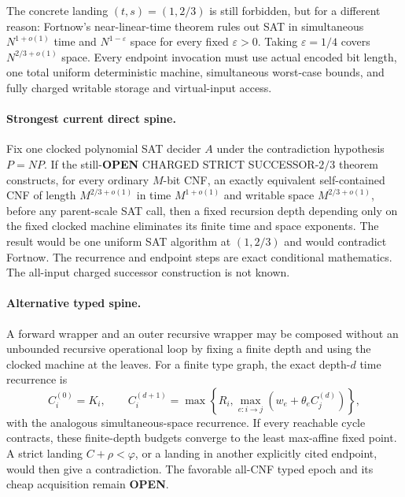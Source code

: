 \documentclass[11pt]{article}
\begin{document}
The concrete landing $(t,s)=(1,2/3)$ is still forbidden, but for a different
reason: Fortnow's near-linear-time theorem rules out SAT in simultaneous
$N^{1+o(1)}$ time and $N^{1-\varepsilon}$ space for every fixed
$\varepsilon>0$.  Taking $\varepsilon=1/4$ covers
$N^{2/3+o(1)}$ space.  Every endpoint invocation must use actual encoded bit
length, one total uniform deterministic machine, simultaneous worst-case
bounds, and fully charged writable storage and virtual-input access.

\paragraph{Strongest current direct spine.}
Fix one clocked polynomial SAT decider $A$ under the contradiction hypothesis
$P=NP$.  If the still-\textbf{OPEN} CHARGED STRICT SUCCESSOR-$2/3$ theorem
constructs, for every ordinary $M$-bit CNF, an exactly equivalent
self-contained CNF of length $M^{2/3+o(1)}$ in time $M^{1+o(1)}$ and writable
space $M^{2/3+o(1)}$, before any parent-scale SAT call, then a fixed recursion
depth depending only on the fixed clocked machine eliminates its finite time
and space exponents.  The result would be one uniform SAT algorithm at
$(1,2/3)$ and would contradict Fortnow.  The recurrence and endpoint steps are
exact conditional mathematics.  The all-input charged successor construction
is not known.

\paragraph{Alternative typed spine.}
A forward wrapper and an outer recursive wrapper may be composed without an
unbounded recursive operational loop by fixing a finite depth and using the
clocked machine at the leaves.  For a finite type graph, the exact depth-$d$
time recurrence is
\[
 C_i^{(0)}=K_i,
 \qquad
 C_i^{(d+1)}=
 \max\!\left\{R_i,\max_{e:i\to j}
       (w_e+\theta_e C_j^{(d)})\right\},
\]
with the analogous simultaneous-space recurrence.  If every reachable cycle
contracts, these finite-depth budgets converge to the least max-affine fixed
point.  A strict landing $C+\rho<\varphi$, or a landing in another explicitly
cited endpoint, would then give a contradiction.  The favorable all-CNF typed
epoch and its cheap acquisition remain \textbf{OPEN}.
\end{document}
